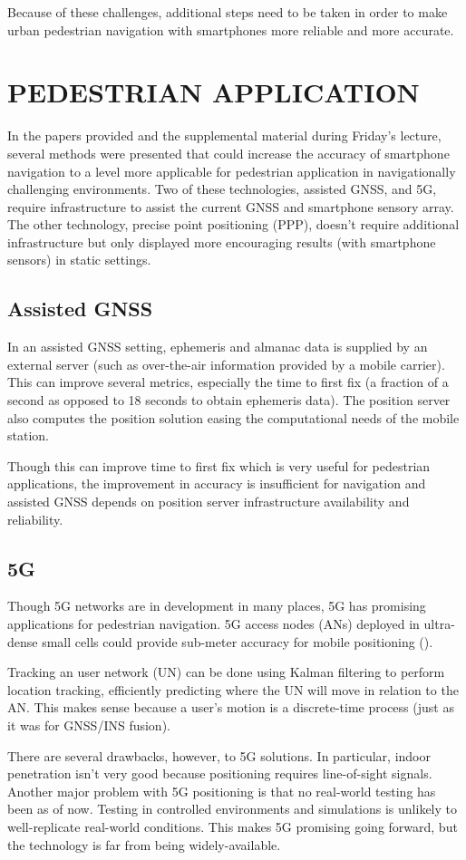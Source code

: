 \documentclass[twoside]{article}
\begin{document}
Because of these challenges, additional steps need to be taken in order to make urban pedestrian navigation
with smartphones more reliable and more accurate.
\section{PEDESTRIAN APPLICATION}
In the papers provided and the supplemental material during Friday's lecture, several methods were presented
that could increase the accuracy of smartphone navigation to a level more applicable for pedestrian application
in navigationally challenging environments. Two of these technologies, assisted GNSS, and
5G, require infrastructure to assist the current GNSS and smartphone sensory array. The other technology,
precise point positioning (PPP), doesn't require additional infrastructure but only displayed more encouraging
results (with smartphone sensors) in static settings.
\subsection{Assisted GNSS}
In an assisted GNSS setting, ephemeris and almanac data is supplied by an external server (such as over-the-air
information provided by a mobile carrier). This can improve several metrics, especially the time to first
fix (a fraction of a second as opposed to 18 seconds to obtain ephemeris data). The position server also
computes the position solution easing the computational needs of the mobile station.

Though this can improve time to first fix which is very useful for pedestrian applications, the improvement
in accuracy is insufficient for navigation and assisted GNSS depends on position server infrastructure
availability and reliability.
\subsection{5G}
Though 5G networks are in development in many places, 5G has promising applications for pedestrian
navigation. 5G access nodes (ANs) deployed in ultra-dense small cells could provide sub-meter accuracy for
mobile positioning (\cite{5G}). 

Tracking an user network (UN) can be done using Kalman filtering to perform location tracking, efficiently
predicting where the UN will move in relation to the AN. This makes sense because a user's motion is a
discrete-time process (just as it was for GNSS/INS fusion).

There are several drawbacks, however, to 5G solutions. In particular, indoor penetration
isn't very good because positioning requires line-of-sight signals. Another major problem with 5G
positioning is that no real-world testing has been as of now. Testing in controlled environments and
simulations is unlikely to well-replicate real-world conditions. This makes 5G promising going forward,
but the technology is far from being widely-available.
\end{document}
